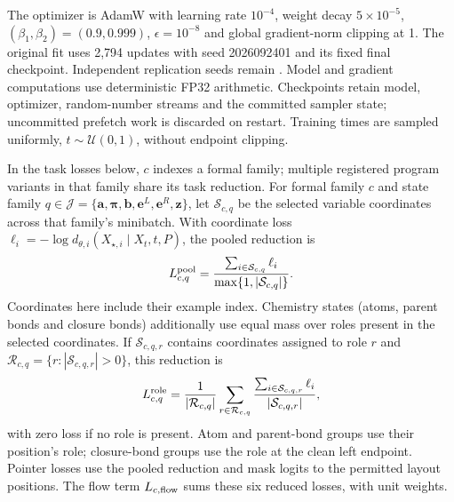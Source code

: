 The optimizer is AdamW with learning rate $10^{-4}$, weight decay $5\times10^{-5}$,
$(\beta_1,\beta_2)=(0.9,0.999)$, $\epsilon=10^{-8}$ and global gradient-norm clipping at 1.
The original fit uses 2,794 updates with seed 2026092401 and its fixed final checkpoint.
Independent replication seeds remain . Model and gradient
computations use deterministic FP32 arithmetic. Checkpoints retain model, optimizer, random-number
streams and the committed sampler state; uncommitted prefetch work is discarded on restart.
Training times are sampled uniformly, $t\sim\mathcal U(0,1)$, without endpoint clipping.

In the task losses below, $c$ indexes a formal family; multiple registered program variants in that
family share its task reduction.
For formal family $c$ and state family
$q\in\mathscr J=\{\mathbf a,\boldsymbol\pi,\mathbf b,\mathbf e^L,\mathbf e^R,\mathbf z\}$,
let $\mathcal S_{c,q}$ be the selected variable coordinates across that family's minibatch.
With coordinate loss $\ell_i=-\log d_{\theta,i}(X_{\star,i}\mid X_t,t,P)$, the pooled reduction is
\begin{equation}
 L_{c,q}^{\rm pool}=\frac{\sum_{i\in\mathcal S_{c,q}}\ell_i}{\max\{1,|\mathcal S_{c,q}|\}}.
\end{equation}
Coordinates here include their example index. Chemistry states (atoms, parent bonds and closure
bonds) additionally use equal mass over roles present in the selected coordinates. If
$\mathcal S_{c,q,r}$ contains coordinates assigned to role $r$ and
$\mathcal R_{c,q}=\{r:|\mathcal S_{c,q,r}|>0\}$, this reduction is
\begin{equation}
 L_{c,q}^{\rm role}=\frac{1}{|\mathcal R_{c,q}|}
 \sum_{r\in\mathcal R_{c,q}}\frac{\sum_{i\in\mathcal S_{c,q,r}}\ell_i}{|\mathcal S_{c,q,r}|},
 \label{eq:role-balanced-loss}
\end{equation}
with zero loss if no role is present. Atom and parent-bond groups use their position's role;
closure-bond groups use the role at the clean left endpoint. Pointer losses use the pooled reduction
and mask logits to the permitted layout positions. The flow term $L_{c,\rm flow}$ sums these six
reduced losses, with unit weights.

